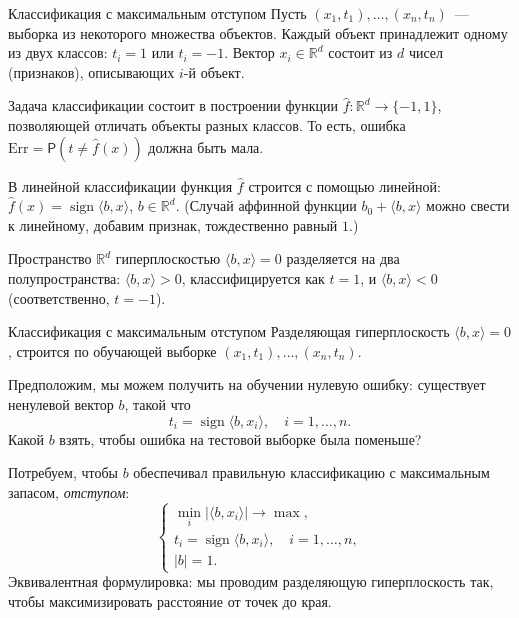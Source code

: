 \documentclass[handout]{beamer}
\newcommand\R{\mathbb R}
\renewcommand\P{\mathsf P}
\DeclareMathOperator{\sign}{sign}
\begin{document}
\begin{frame}{Классификация с максимальным отступом}
    Пусть $(x_1,t_1),\ldots,(x_n,t_n)$~--- выборка из некоторого множества
    объектов. Каждый объект принадлежит одному из двух классов: $t_i=1$ или
    $t_i=-1$. Вектор $x_i\in\R^d$ состоит из $d$ чисел (признаков), описывающих $i$-й
    объект.
    \pause\vspace{5pt}

    Задача классификации состоит в построении функции $\hat{f}\colon\R^d\to\{-1,1\}$,
    позволяющей отличать объекты разных классов. То есть, ошибка
    $\mathrm{Err}=\P(t\ne\hat{f}(x))$ должна быть мала.
    \pause\vspace{5pt}

    В линейной классификации функция $\hat f$ строится с помощью линейной: $\hat
    f(x)=\sign\langle b,x\rangle$, $b\in\R^d$. (Случай аффинной функции $b_0+\langle b,x\rangle$ можно свести
    к линейному, добавим признак, тождественно равный $1$.)
    \pause\vspace{5pt}
    
    Пространство $\R^d$ гиперплоскостью $\langle b,x\rangle=0$ разделяется на два
    полупространства: $\langle b,x\rangle>0$, классифицируется как $t=1$, и
    $\langle b,x\rangle<0$ (соответственно, $t=-1$).
\end{frame}

\begin{frame}{Классификация с максимальным отступом}
    Разделяющая гиперплоскость $\langle b,x\rangle=0$, строится по обучающей выборке
    $(x_1,t_1),\ldots,(x_n,t_n)$.
    \pause\vspace{5pt}

    Предположим, мы можем получить на обучении нулевую ошибку: существует
    ненулевой вектор $b$, такой что
    $$
    t_i = \sign \langle b,x_i\rangle,\quad i=1,\ldots,n.
    $$
    Какой $b$ взять, чтобы ошибка на тестовой выборке была поменьше?
    \pause\vspace{5pt}

    Потребуем, чтобы $b$ обеспечивал правильную классификацию с максимальным
    запасом, \textit{отступом}:
    $$
    \begin{cases}
        \min\limits_i |\langle b,x_i\rangle| \to \max,\\
        t_i=\sign \langle b,x_i\rangle,\quad i=1,\ldots,n,\\
        |b|=1.
    \end{cases}
    $$
    \pause
    Эквивалентная формулировка: мы проводим разделяющую гиперплоскость так,
    чтобы максимизировать расстояние от точек до края.
\end{frame}
\end{document}
